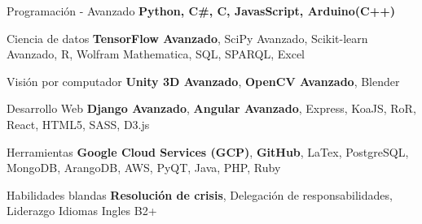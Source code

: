 

\begin{cvskills}

  \cvskill
    {Programación - Avanzado} %
    {\textbf{Python, C\#, C, JavasScript, Arduino(C++)}} %

  \cvskill
    {Ciencia de datos}
    {\textbf{TensorFlow Avanzado}, SciPy Avanzado, Scikit-learn Avanzado, R, Wolfram Mathematica, SQL, SPARQL, Excel}

  \cvskill
    {Visión por computador} %
    {\textbf{Unity 3D Avanzado}, \textbf{OpenCV Avanzado}, Blender} %

  \cvskill
    {Desarrollo Web} %
    {\textbf{Django Avanzado}, \textbf{Angular Avanzado}, Express, KoaJS, RoR, React, HTML5, SASS, D3.js} %

  \cvskill
    {Herramientas}
    {\textbf{Google Cloud Services (GCP)}, \textbf{GitHub}, LaTex, PostgreSQL, MongoDB, ArangoDB, AWS, PyQT, Java, PHP, Ruby}

  \cvskill
    {Habilidades blandas}
    {\textbf{Resolución de crisis}, Delegación de responsabilidades, Liderazgo}
  \cvskill
    {Idiomas} %
    {Ingles B2+} %

\end{cvskills}
